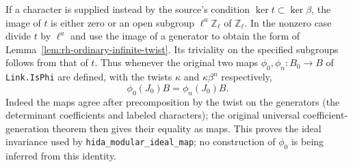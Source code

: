 If a character is supplied instead by the source's condition
$\ker t\subset\ker\beta$, the image of $t$ is either zero or an open
subgroup $\ell^a\mathbb Z_\ell$ of $\mathbb Z_\ell$. In the nonzero case
divide $t$ by $\ell^a$ and use the image of a generator to obtain the
form of Lemma~\ref{lem:rh-ordinary-infinite-twist}. Its triviality on
the specified subgroups follows from that of $t$. Thus whenever the
original two maps $\phi_0,\phi_n:B_0\to B$ of \texttt{Link.IsPhi}
are defined, with the twists $\kappa$ and $\kappa\beta^n$ respectively,
\[
                       \phi_0(J_0)B=\phi_n(J_0)B .             \tag{RS1}
\]
Indeed the maps agree after precomposition by the twist on the
generators (the determinant coefficients and labeled characters);
the original universal coefficient-generation theorem then gives
their equality as maps. This proves the ideal invariance used by
\texttt{hida\_modular\_ideal\_map}; no construction of $\phi_0$
is being inferred from this identity.

